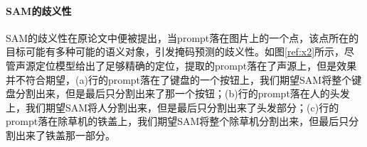 \documentclass[12pt]{article}
\begin{document}
\paragraph{SAM的歧义性}
SAM的歧义性在原论文中便被提出，当prompt落在图片上的一个点，该点所在的目标可能有多种可能的语义对象，引发掩码预测的歧义性。如图\ref{ref:x2}所示，尽管声源定位模型给出了足够精确的定位，提取的prompt落在了声源上，但是效果并不符合期望，(a)行的prompt落在了键盘的一个按钮上，我们期望SAM将整个键盘分割出来，但是最后只分割出来了那一个按钮；(b)行的prompt落在人的头发上，我们期望SAM将人分割出来，但是最后只分割出来了头发部分；(c)行的prompt落在除草机的铁盖上，我们期望SAM将整个除草机分割出来，但最后只分割出来了铁盖那一部分。
\begin{figure}[!h]
  \centering
\end{figure}
\end{document}
